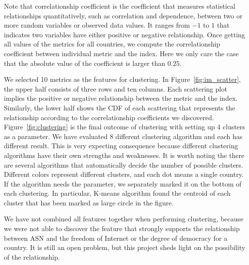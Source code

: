 \documentclass{article}
\begin{document}
\bigskip

\noindent
Note that correlationship coefficient is the coefficient that measures
statistical relationships quantitatively, such as correlation and dependence,
between two or more random variables or observed data values. It ranges from
$-1$ to $1$ that indicates two variables have either positive or negative
relationship. Once getting all values of the metrics for all countries, we
compute the correlationship coefficient between individual metric and the index.
Here we only care the case that the absolute value of the coefficient is larger than
$0.25$.

\bigskip

\noindent
We selected 10 metrics as the features for clustering. In Figure~\ref{fig:im_scatter},
the upper half consists of three rows and ten columns. Each scattering plot implies the 
positive or negative relationship between the metric and the index. Similarly, the lower 
half shows the CDF of each scattering that represents the relationship according to
the correlationship coefficients we discovered. Figure~\ref{fig:clustering} is the final
outcome of clustering with setting up 4 clusters as a parameter. We have evaluated
8 different clustering algorithm and each has different result. This is very expecting 
consequence because different clustering algorithms have their own strengths and
weaknesses. It is worth noting the there are several algorithms that automatically decide
the number of possible clusters. Different colors represent different clusters,
and each dot means a single country. If the algorithm needs the parameter, we separately
marked it on the bottom of each clustering. 
In particular, K-means algorithm found the centroid of each cluster that has been marked
as large circle in the figure.

\bigskip

\noindent
We have not combined all features together when performing clustering, because we were
not able to discover the feature that strongly supports the relationship between ASN and 
the freedom of Internet or the degree of democracy for a country. It is still an open problem,
but this project sheds light on the possibility of the relationship.
\end{document}
